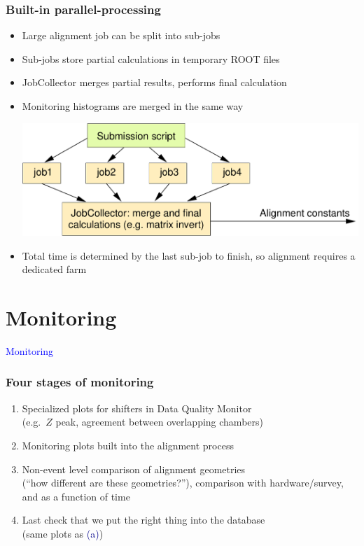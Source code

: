 \documentclass[compress]{beamer}
\begin{document}
\begin{frame}
\frametitle{Built-in parallel-processing}
\begin{itemize}
\item Large alignment job can be split into sub-jobs
\item Sub-jobs store partial calculations in temporary ROOT files
\item JobCollector merges partial results, performs final calculation
\item Monitoring histograms are merged in the same way

\vfill
\begin{center}
\includegraphics[width=0.8\linewidth]{jobcollector.pdf}
\end{center}

\vfill
\item Total time is determined by the last sub-job to finish, so
alignment requires a dedicated farm
\end{itemize}
\end{frame}

\section*{Monitoring}

\begin{frame}
\begin{center}
\Huge \textcolor{blue}{Monitoring}
\end{center}
\end{frame}

\begin{frame}
\frametitle{Four stages of monitoring}
\begin{enumerate}\setlength{\itemsep}{0.75 cm}
\item Specialized plots for shifters in Data Quality Monitor \\ (e.g.\ $Z$ peak, agreement between overlapping chambers)
\item Monitoring plots built into the alignment process
\item Non-event level comparison of alignment geometries \\ (``how
different are these geometries?''), comparison with hardware/survey, and
as a function of time
\item Last check that we put the right thing into the database \\
(same plots as \textcolor{darkblue}{(a)})
\end{enumerate}
\end{frame}
\end{document}
